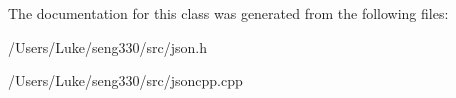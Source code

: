 The documentation for this class was generated from the following files\+:\begin{DoxyCompactItemize}
\item 
/\+Users/\+Luke/seng330/src/json.\+h\item 
/\+Users/\+Luke/seng330/src/jsoncpp.\+cpp\end{DoxyCompactItemize}
